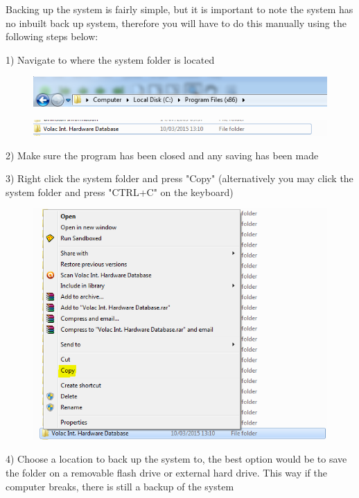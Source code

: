 Backing up the system is fairly simple, but it is important to note the system has no inbuilt back up system, therefore you will have to do this manually using the following steps below:

1) Navigate to where the system folder is located

\begin{figure}[H]
    \includegraphics[width=\textwidth]{./Manual/Images/backup1.png}
\end{figure}

\begin{figure}[H]
    \includegraphics[width=\textwidth]{./Manual/Images/backup2.png}
\end{figure}


2) Make sure the program has been closed and any saving has been made

3) Right click the system folder and press "Copy" (alternatively you may click the system folder and press "CTRL+C" on the keyboard)

\begin{figure}[H]
    \includegraphics[width=\textwidth]{./Manual/Images/backup3.png}
\end{figure}

4) Choose a location to back up the system to, the best option would be to save the folder on a removable flash drive or external hard drive. This way if the computer breaks, there is still a backup of the system


